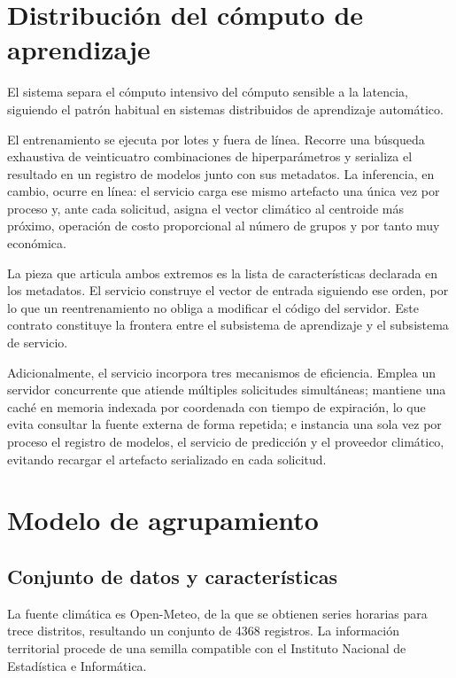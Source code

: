 \documentclass[conference]{IEEEtran}
\begin{document}
\section{Distribuci\'on del c\'omputo de aprendizaje}

El sistema separa el c\'omputo intensivo del c\'omputo sensible a la latencia,
siguiendo el patr\'on habitual en sistemas distribuidos de aprendizaje
autom\'atico.

El entrenamiento se ejecuta por lotes y fuera de l\'inea. Recorre una
b\'usqueda exhaustiva de veinticuatro combinaciones de hiperpar\'ametros y
serializa el resultado en un registro de modelos junto con sus metadatos. La
inferencia, en cambio, ocurre en l\'inea: el servicio carga ese mismo artefacto
una \'unica vez por proceso y, ante cada solicitud, asigna el vector clim\'atico
al centroide m\'as pr\'oximo, operaci\'on de costo proporcional al n\'umero de
grupos y por tanto muy econ\'omica.

La pieza que articula ambos extremos es la lista de caracter\'isticas declarada
en los metadatos. El servicio construye el vector de entrada siguiendo ese
orden, por lo que un reentrenamiento no obliga a modificar el c\'odigo del
servidor. Este contrato constituye la frontera entre el subsistema de
aprendizaje y el subsistema de servicio.

Adicionalmente, el servicio incorpora tres mecanismos de eficiencia. Emplea un
servidor concurrente que atiende m\'ultiples solicitudes simult\'aneas; mantiene
una cach\'e en memoria indexada por coordenada con tiempo de expiraci\'on, lo
que evita consultar la fuente externa de forma repetida; e instancia una sola
vez por proceso el registro de modelos, el servicio de predicci\'on y el
proveedor clim\'atico, evitando recargar el artefacto serializado en cada
solicitud.

\section{Modelo de agrupamiento}

\subsection{Conjunto de datos y caracter\'isticas}

La fuente clim\'atica es Open-Meteo, de la que se obtienen series horarias para
trece distritos, resultando un conjunto de 4368 registros. La informaci\'on
territorial procede de una semilla compatible con el Instituto Nacional de
Estad\'istica e Inform\'atica.
\end{document}

